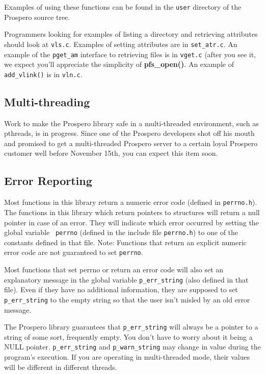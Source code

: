 Examples of using these functions can be found in the {\tt user}
directory of the Prospero source tree.

Programmers looking for examples of listing a directory and retrieving
attributes should look at {\tt vls.c}.  Examples of setting attributes
are in {\tt set\_atr.c}.  An example of the {\tt pget\_am} interface
to retrieving files is in {\tt vget.c} (after you see it, we expect
you'll appreciate the simplicity of {\bf pfs\_open()}.  An example of {\tt
add\_vlink()} is in {\tt vln.c}.

\subsection{Multi-threading}

Work to make the Prospero library safe in a multi-threaded
environment, such as pthreads, is in progress.  Since one of the
Prospero developers shot off his mouth and promised to get a
multi-threaded Prospero server to a certain loyal Prospero customer
well before November 15th, you can expect this item soon.

\subsection{Error Reporting}

Most functions in this library return a numeric error code (defined in
{\tt perrno.h}).  The functions in this library which return pointers
to structures will return a null pointer in case of an error.  They
will indicate which error occurred by setting the global variable {\tt
perrno} (defined in the include file {\tt perrno.h}) to one of the
constants defined in that file.  Note: Functions that return an
explicit numeric error code are not guaranteed to set {\tt perrno}.

Most functions that set perrno or return an error code will also set
an explanatory message in the global variable {\tt p\_err\_string}
(also defined in that file).   Even if they have no additional
information, they are supposed to set {\tt p\_err\_string} to the
empty string so that the user isn't misled by an old error message.

The Prospero library guarantees that {\tt p\_err\_string} will always
be a pointer to a string of some sort, frequently empty.  You don't
have to worry about it being a NULL pointer.  {\tt p\_err\_string} and
{\tt p\_warn\_string} may change in value during the program's
execution.  If you are operating in multi-threaded mode, their values
will be different in different threads.

